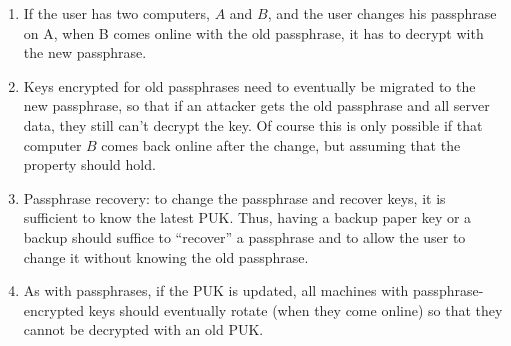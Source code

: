 \begin{enumerate}

\item If the user has two computers, $A$ and $B$, and the user changes his passphrase on A, when B comes online
 with the old passphrase, it has to decrypt with the new passphrase.

\item Keys encrypted for old passphrases need to eventually be migrated to the new passphrase, so that if
an attacker gets the old passphrase and all server data, they still can't decrypt the key.  Of course
this is only possible if that computer $B$ comes back online after the change, but assuming that
the property should hold.

\item Passphrase recovery: to change the passphrase and recover keys, it is sufficient to know the latest PUK.
 Thus, having a backup paper key or a backup \yubi{} should suffice to ``recover'' a passphrase
 and to allow the user to change it without knowing the old passphrase.

\item As with passphrases, if the PUK is updated, all machines with passphrase-encrypted keys
  should eventually rotate (when they come online) so that they cannot be decrypted with an old PUK.

\end{enumerate}

\label{sec:passphrase}

\newcommand{\secretBox}[2]{\textsf{secretBox}(#1, #2)}
\newcommand{\dhbox}[3]{\textsf{dhBox}(#1, #2, #3)}
\newcommand{\pk}[1]{\textsf{publicKey}(#1)}
\newcommand{\sk}[1]{\textsf{secretKey}(#1)}

